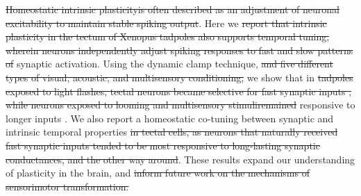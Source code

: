 \documentclass{article}
\providecommand{\DIFaddtex}[1]{{\protect\color{blue}{#1}}} %
\providecommand{\DIFdeltex}[1]{{\protect\color{red}\sout{#1}}}                      %
\providecommand{\DIFaddbegin}{} %
\providecommand{\DIFaddend}{} %
\providecommand{\DIFdelbegin}{} %
\providecommand{\DIFdelend}{} %
\providecommand{\DIFadd}[1]{\texorpdfstring{\DIFaddtex{#1}}{#1}} %
\providecommand{\DIFdel}[1]{\texorpdfstring{\DIFdeltex{#1}}{}} %
\newcommand{\DIFscaledelfig}{0.5}
\newlength{\DIFdelgraphicswidth} %
\newlength{\DIFdelgraphicsheight} %
\newcommand{\DIFaddincludegraphics}[2][]{{\color{blue}\fbox{\DIFOincludegraphics[#1]{#2}}}} %
\newcommand{\DIFdelincludegraphics}[2][]{%
\sbox{\DIFdelgraphicsbox}{\DIFOincludegraphics[#1]{#2}}%
\settoboxwidth{\DIFdelgraphicswidth}{\DIFdelgraphicsbox} %
\settoboxtotalheight{\DIFdelgraphicsheight}{\DIFdelgraphicsbox} %
\scalebox{\DIFscaledelfig}{%
\parbox[b]{\DIFdelgraphicswidth}{\usebox{\DIFdelgraphicsbox}\\[-\baselineskip] \rule{\DIFdelgraphicswidth}{0em}}\llap{\resizebox{\DIFdelgraphicswidth}{\DIFdelgraphicsheight}{%
\setlength{\unitlength}{\DIFdelgraphicswidth}%
\begin{picture}(1,1)%
\thicklines\linethickness{2pt} %
{\color[rgb]{1,0,0}\put(0,0){\framebox(1,1){}}}%
{\color[rgb]{1,0,0}\put(0,0){\line( 1,1){1}}}%
{\color[rgb]{1,0,0}\put(0,1){\line(1,-1){1}}}%
\end{picture}%
}\hspace*{3pt}}} %
} %
\DeclareRobustCommand{\DIFaddbegin}{\DIFOaddbegin \let\includegraphics\DIFaddincludegraphics} %
\DeclareRobustCommand{\DIFaddend}{\DIFOaddend \let\includegraphics\DIFOincludegraphics} %
\DeclareRobustCommand{\DIFdelbegin}{\DIFOdelbegin \let\includegraphics\DIFdelincludegraphics} %
\DeclareRobustCommand{\DIFdelend}{\DIFOaddend \let\includegraphics\DIFOincludegraphics} %
\begin{document}
\begin{flushleft}
\DIFdelbegin \DIFdel{Homeostatic intrinsic plasticityis often described as an adjustment of neuronal excitability to maintain stable spiking output}\DIFdelend \DIFaddbegin \DIFadd{For a biological neural network to be functional, its neurons need to be connected with synapses of appropriate strength, and each neuron needs to appropriately respond to its synaptic inputs. This second aspect of network tuning is maintained by intrinsic plasticity; yet it is often considered secondary to changes in connectivity, and mostly limited to adjustments of overall excitability of each neuron}\DIFaddend . Here we \DIFdelbegin \DIFdel{report that intrinsic plasticity in the tectum of Xenopus tadpoles also supports temporal tuning, wherein neurons independently adjust spiking responses to fast and slow patterns of }\DIFdelend \DIFaddbegin \DIFadd{argue that even non-oscillatory neurons can be tuned to inputs of different temporal dynamics, and that they can routinely adjust this tuning to match the statistics of their }\DIFaddend synaptic activation. Using the dynamic clamp technique, \DIFdelbegin \DIFdel{and five different types of visual, acoustic, and multisensory conditioning, }\DIFdelend we show that in \DIFdelbegin \DIFdel{tadpoles exposed to light flashes, tectal neurons became selective for fast synaptic inputs , while neurons exposed to looming and multisensory stimuliremained }\DIFdelend \DIFaddbegin \DIFadd{the tectum of Xenopus tadpoles, neurons become selective for faster inputs when animals are exposed to fast visual stimuli, but remain }\DIFaddend responsive to longer inputs \DIFaddbegin \DIFadd{in animals exposed to slower, looming or multisensory stimulation}\DIFaddend . We also report a homeostatic co-tuning between synaptic and intrinsic temporal properties \DIFdelbegin \DIFdel{in tectal cells, as neurons that naturally received fast synaptic inputs tended to be most responsive to long-lasting synaptic conductances, and the other way around}\DIFdelend \DIFaddbegin \DIFadd{of individual tectal cells}\DIFaddend . These results expand our understanding of \DIFaddbegin \DIFadd{intrinsic }\DIFaddend plasticity in the brain, and \DIFdelbegin \DIFdel{inform future work on the mechanisms of sensorimotor transformation.
}\DIFdelend \DIFaddbegin \DIFadd{suggest that there may exist an additional dimension of network tuning that has been so far overlooked.
}\DIFaddend 

\DIFdelbegin %

\DIFdelend %

\bigskip

\end{flushleft} %
\end{document}
